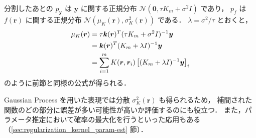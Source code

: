 分割したあとの
$p_{\bm{y}}$ は $\bm{y}$ に関する正規分布 $\mathcal{N}(\bm{0}, \tau K_m + \sigma^2 I)$ であり，
$p_f$ は $f(\bm{r})$ に関する正規分布 $\mathcal{N}(\mu_K(\bm{r}), \sigma_K^2(\bm{r}))$ である．
$\lambda = \sigma^2 / \tau$ とおくと，
\begin{align}
    \mu_K(\bm{r})
     & = \tau \bm{k}(\bm{r})^T (\tau K_m + \sigma^2 I)^{-1} \bm{y}
    \notag                                                                               \\
     & = \bm{k}(\bm{r})^T (K_m + \lambda I)^{-1} \bm{y}
    \notag                                                                               \\
     & = \sum_{i = 1}^m K(\bm{r}, \bm{r}_i) \left[(K_m + \lambda I)^{-1} \bm{y}\right]_i
\end{align}
のように前節と同様の公式が得られる．

Gaussian Process を用いた表現では分散 $\sigma_K^2(\bm{r})$ も得られるため，
補間された関数のどの部分に誤差が多い可能性が高いか評価するのにも役立つ．
また，パラメータ推定において確率の最大化を行うといった応用もある
（\ref{sec:regularization_kernel_param-est} 節）．
